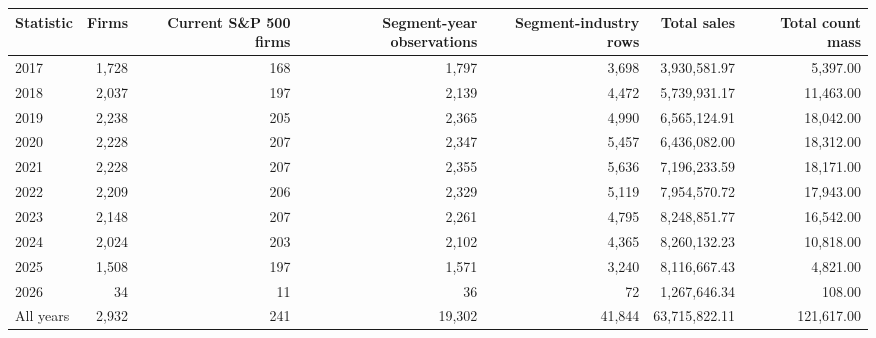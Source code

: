 \begin{tabular}{@{}lrrrrrr@{}}
\toprule
Statistic & \textbf{Firms} & \textbf{Current S\&P 500 firms} & \textbf{Segment-year observations} & \textbf{Segment-industry rows} & \textbf{Total sales} & \textbf{Total count mass} \\
\midrule
2017 & 1,728 & 168 & 1,797 & 3,698 & 3,930,581.97 & 5,397.00 \\
2018 & 2,037 & 197 & 2,139 & 4,472 & 5,739,931.17 & 11,463.00 \\
2019 & 2,238 & 205 & 2,365 & 4,990 & 6,565,124.91 & 18,042.00 \\
2020 & 2,228 & 207 & 2,347 & 5,457 & 6,436,082.00 & 18,312.00 \\
2021 & 2,228 & 207 & 2,355 & 5,636 & 7,196,233.59 & 18,171.00 \\
2022 & 2,209 & 206 & 2,329 & 5,119 & 7,954,570.72 & 17,943.00 \\
2023 & 2,148 & 207 & 2,261 & 4,795 & 8,248,851.77 & 16,542.00 \\
2024 & 2,024 & 203 & 2,102 & 4,365 & 8,260,132.23 & 10,818.00 \\
2025 & 1,508 & 197 & 1,571 & 3,240 & 8,116,667.43 & 4,821.00 \\
2026 & 34 & 11 & 36 & 72 & 1,267,646.34 & 108.00 \\
\midrule
All years & 2,932 & 241 & 19,302 & 41,844 & 63,715,822.11 & 121,617.00 \\
\bottomrule
\end{tabular}
